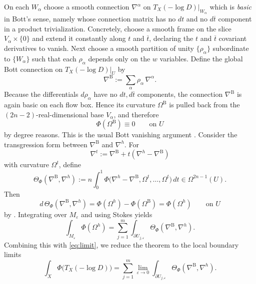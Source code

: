 \documentclass[12pt,a4paper,dvipsnames,x11names]{amsart}
\numberwithin{equation}{section}
\theoremstyle{plain}
\theoremstyle{definition}
\theoremstyle{remark}
\begin{document}
On each $W_\alpha$ choose a smooth connection $\nabla^\alpha$ on $T_X(-\log D)|_{W_\alpha}$ which is \emph{basic} in Bott's sense, namely whose connection matrix has no $dt$ and no $d\overline t$ component in a product trivialization. Concretely, choose a smooth frame on the slice $V_\alpha\times\{0\}$ and extend it constantly along $t$ and $\overline t$, declaring the $t$ and $\overline t$ covariant derivatives to vanish. Next choose a smooth partition of unity $\{\rho_\alpha\}$ subordinate to $\{W_\alpha\}$ such that each $\rho_\alpha$ depends only on the $w$ variables. Define the global Bott connection on $T_X(-\log D)|_U$ by
\begin{equation}\label{eq:global-bott}
\nabla^{\mathrm B}:=\sum_\alpha \rho_\alpha\,\nabla^\alpha.
\end{equation}
Because the differentials $d\rho_\alpha$ have no $dt,d\overline t$ components, the connection $\nabla^{\mathrm B}$ is again basic on each flow box. Hence its curvature $\Omega^{\mathrm B}$ is pulled back from the $(2n-2)$-real-dimensional base $V_\alpha$, and therefore
\begin{equation}\label{eq:basic-vanishing}
\Phi(\Omega^{\mathrm B})\equiv 0
\qquad \text{on } U
\end{equation}
by degree reasons. This is the usual Bott vanishing argument \cite{Bott67a,BottTu,SuwaBook}.
Consider the   transgression form between $\nabla^{\mathrm B}$ and $\nabla^h$. For
\begin{equation}\label{eq:nabla-t}
\nabla^t:=\nabla^{\mathrm B}+t(\nabla^h-\nabla^{\mathrm B})
\end{equation}
with curvature $\Omega^t$, define
\begin{equation}\label{eq:CS-def}
\Theta_\Phi(\nabla^{\mathrm B},\nabla^h)
:=
n\int_0^1 \Phi\big(\nabla^h-\nabla^{\mathrm B},\Omega^t,\dots,\Omega^t\big)\,dt
\in \Omega^{2n-1}(U).
\end{equation}
Then
\begin{equation}\label{eq:CS}
d\,\Theta_\Phi(\nabla^{\mathrm B},\nabla^h)=\Phi(\Omega^h)-\Phi(\Omega^{\mathrm B})=\Phi(\Omega^h)
\qquad \text{on } U
\end{equation}
by \cite{ChernSimons74,BottTu}. Integrating over $M_\varepsilon$ and using Stokes yields
\begin{equation}\label{eq:boundary-sum}
\int_{M_\varepsilon}\Phi(\Omega^h)
=
\sum_{j=1}^m \int_{\partial U_{j,\varepsilon}}\Theta_\Phi(\nabla^{\mathrm B},\nabla^h).
\end{equation}
Combining this with \eqref{eq:limit}, we reduce the theorem to the local boundary limits
\begin{equation}\label{eq:boundary-limit}
\int_X \Phi\bigl(T_X(-\log D)\bigr)
=
\sum_{j=1}^m \lim_{\varepsilon\to 0}\int_{\partial U_{j,\varepsilon}}\Theta_\Phi(\nabla^{\mathrm B},\nabla^h).
\end{equation}
\end{document}
